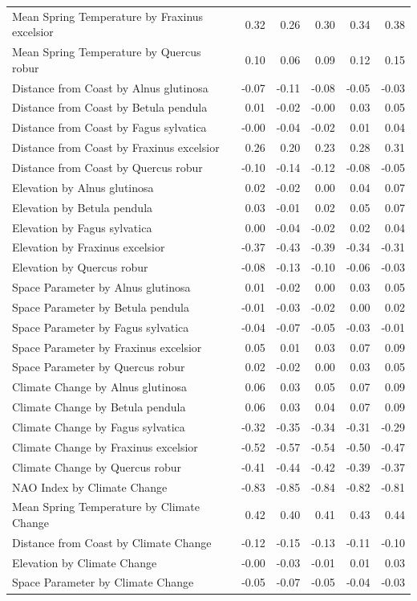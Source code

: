 \documentclass{article}\usepackage[]{graphicx}\usepackage[]{color}
\begin{document}
\begin{longtable}{lrrrrr}
  Mean Spring 
Temperature
by Fraxinus excelsior & 0.32 & 0.26 & 0.30 & 0.34 & 0.38 \\ 
  Mean Spring 
Temperature
by Quercus robur & 0.10 & 0.06 & 0.09 & 0.12 & 0.15 \\ 
  Distance from 
Coast
by Alnus glutinosa & -0.07 & -0.11 & -0.08 & -0.05 & -0.03 \\ 
  Distance from 
Coast
by Betula pendula & 0.01 & -0.02 & -0.00 & 0.03 & 0.05 \\ 
  Distance from 
Coast
by Fagus sylvatica & -0.00 & -0.04 & -0.02 & 0.01 & 0.04 \\ 
  Distance from 
Coast
by Fraxinus excelsior & 0.26 & 0.20 & 0.23 & 0.28 & 0.31 \\ 
  Distance from 
Coast
by Quercus robur & -0.10 & -0.14 & -0.12 & -0.08 & -0.05 \\ 
  Elevation
by Alnus glutinosa & 0.02 & -0.02 & 0.00 & 0.04 & 0.07 \\ 
  Elevation
by Betula pendula & 0.03 & -0.01 & 0.02 & 0.05 & 0.07 \\ 
  Elevation
by Fagus sylvatica & 0.00 & -0.04 & -0.02 & 0.02 & 0.04 \\ 
  Elevation
by Fraxinus excelsior & -0.37 & -0.43 & -0.39 & -0.34 & -0.31 \\ 
  Elevation
by Quercus robur & -0.08 & -0.13 & -0.10 & -0.06 & -0.03 \\ 
  Space Parameter
by Alnus glutinosa & 0.01 & -0.02 & 0.00 & 0.03 & 0.05 \\ 
  Space Parameter
by Betula pendula & -0.01 & -0.03 & -0.02 & 0.00 & 0.02 \\ 
  Space Parameter
by Fagus sylvatica & -0.04 & -0.07 & -0.05 & -0.03 & -0.01 \\ 
  Space Parameter
by Fraxinus excelsior & 0.05 & 0.01 & 0.03 & 0.07 & 0.09 \\ 
  Space Parameter
by Quercus robur & 0.02 & -0.02 & 0.00 & 0.03 & 0.05 \\ 
  Climate Change
by Alnus glutinosa & 0.06 & 0.03 & 0.05 & 0.07 & 0.09 \\ 
  Climate Change
by Betula pendula & 0.06 & 0.03 & 0.04 & 0.07 & 0.09 \\ 
  Climate Change
by Fagus sylvatica & -0.32 & -0.35 & -0.34 & -0.31 & -0.29 \\ 
  Climate Change
by Fraxinus excelsior & -0.52 & -0.57 & -0.54 & -0.50 & -0.47 \\ 
  Climate Change
by Quercus robur & -0.41 & -0.44 & -0.42 & -0.39 & -0.37 \\ 
  NAO Index by Climate Change & -0.83 & -0.85 & -0.84 & -0.82 & -0.81 \\ 
  Mean Spring 
Temperature by Climate Change & 0.42 & 0.40 & 0.41 & 0.43 & 0.44 \\ 
  Distance from 
Coast by Climate Change & -0.12 & -0.15 & -0.13 & -0.11 & -0.10 \\ 
  Elevation by Climate Change & -0.00 & -0.03 & -0.01 & 0.01 & 0.03 \\ 
  Space Parameter by Climate Change & -0.05 & -0.07 & -0.05 & -0.04 & -0.03 \\ 
   \hline
\hline
\end{longtable}
\end{document}

